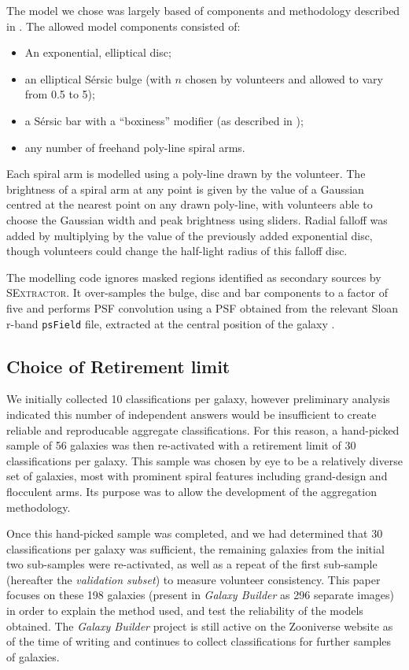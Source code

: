 \documentclass[../main.tex]{subfiles}
\begin{document}
The model we chose was largely based of components and methodology described in \citet{galfit-paper}. The allowed model components consisted of:
\begin{itemize}
\item An exponential, elliptical disc;
\item an elliptical S\'ersic bulge (with $n$ chosen by volunteers and allowed to vary from 0.5 to 5);
\item a S\'ersic bar with a ``boxiness'' modifier (as described in \citealt{galfit-paper});
\item any number of freehand poly-line spiral arms.
\end{itemize}

Each spiral arm is modelled using a poly-line drawn by the volunteer. The brightness of a spiral arm at any point is given by the value of a Gaussian centred at the nearest point on any drawn poly-line, with volunteers able to choose the Gaussian width and peak brightness using sliders. Radial falloff was added by multiplying by the value of the previously added exponential disc, though volunteers could change the half-light radius of this falloff disc.

The modelling code ignores masked regions identified as secondary sources by \textsc{SExtractor}. It over-samples the bulge, disc and bar components to a factor of five and performs PSF convolution using a PSF obtained from the relevant Sloan r-band \texttt{psField} file, extracted at the central position of the galaxy \citep{2002AJ....123..485S}.

\subsection{Choice of Retirement limit}
\label{sec:retirement-limit}

We initially collected 10 classifications per galaxy, however preliminary analysis indicated this number of independent answers would be insufficient to create reliable and reproducable aggregate classifications. For this reason, a hand-picked sample of 56 galaxies was then re-activated with a retirement limit of 30 classifications per galaxy. This sample was chosen by eye to be a relatively diverse set of galaxies, most with prominent spiral features including grand-design and flocculent arms. Its purpose was to allow the development of the aggregation methodology.

Once this hand-picked sample was completed, and we had determined that 30 classifications per galaxy was sufficient, the remaining galaxies from the initial two sub-samples were re-activated, as well as a repeat of the first sub-sample (hereafter the \textit{validation subset}) to measure volunteer consistency. This paper focuses on these 198 galaxies (present in \textit{Galaxy Builder} as 296 separate images) in order to explain the method used, and test the reliability of the models obtained. The \textit{Galaxy Builder} project is still active on the Zooniverse website as of the time of writing and continues to collect classifications for further samples of galaxies.
\end{document}
